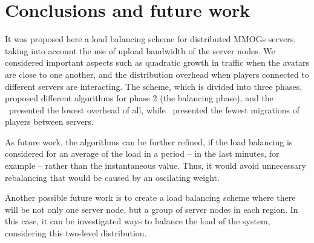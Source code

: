 \section{Conclusions and future work}

It was proposed here a load balancing scheme for distributed MMOGs servers, taking into account the use of upload bandwidth of the server nodes. We considered important aspects such as quadratic growth in traffic when the avatars are close to one another, and the distribution overhead when players connected to different servers are interacting. The scheme, which is divided into three phases, proposed different algorithms for phase 2 (the balancing phase), and the \ggp\ presented the lowest overhead of all, while \ggpf\ presented the fewest migrations of players between servers.

As future work, the algorithms can be further refined, if the load balancing is considered for an average of the load in a period -- in the last minutes, for example -- rather than the instantaneous value. Thus, it would avoid unnecessary rebalancing that would be caused by an oscilating weight.

Another possible future work is to create a load balancing scheme where there will be not only one server node, but a group of server nodes in each region. In this case, it can be investigated ways to balance the load of the system, considering this two-level distribution.

